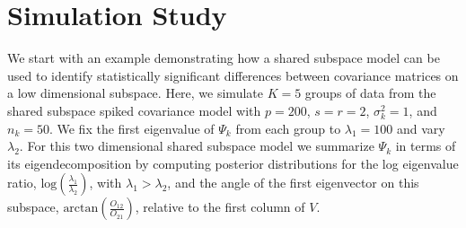\documentclass[12pt]{article}
\newcommand{\etr}{\text{etr}}
\begin{document}





\section{Simulation Study}
\label{sec:simulation}


We start with an example demonstrating how a shared subspace
model can be used to identify statistically significant differences between
covariance matrices on a low dimensional subspace. Here, we simulate
$K=5$ groups of data from the shared subspace spiked covariance
model with $p=200$, $s=r=2$, $\sigma_k^2=1$, and
$n_k=50$.  We fix the first eigenvalue of $\Psi_k$ from each group to
$\lambda_1=100$ and vary $\lambda_2$.  For this two dimensional shared subspace
model we summarize $\Psi_k$ in terms of its eigendecomposition by
computing posterior distributions for the log eigenvalue ratio,
$\text{log}(\frac{\lambda_1}{\lambda_2})$, with $\lambda_1 > \lambda_2$, and the
angle of the first eigenvector on this subspace,
$\text{arctan}(\frac{O_{12}}{O_{21}})$, relative to the first column
of $V$.
\end{document}
